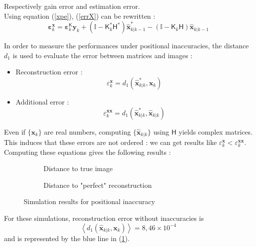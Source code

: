\documentclass[titlepage]{article}
\renewcommand{\H}{\boldsymbol{\mathsf{H}}}
\newcommand{\K}{\boldsymbol{\mathsf{K}}}
\newcommand{\x}{\boldsymbol{x}}
\newcommand{\y}{\boldsymbol{y}}
\newcommand{\xp}{\widehat{\x}_{k|k-1}}
\newcommand{\xe}{\widehat{\x}_{k|k}}
\newcommand{\vbeps}{\boldsymbol{\varepsilon}}
\begin{document}
	Respectively gain error and estimation error.\\
	Using equation (\ref{xpe}), (\ref{errX}) can be rewritten :
	\begin{equation}
		\vbeps^{\x}_k = \vbeps^{\K}_k\y_k + \left(\mathbb{I} - \K_k^*\H^*\right)\xp^* - \left(\mathbb{I} - \K_k\H\right)\xp
	\end{equation}
	
	In order to measure the performances under positional inaccuracies, the distance $d_1$ is used to evaluate the error between matrices and images :
	\begin{itemize}
		\item Reconstruction error : 
		$$
			\varepsilon_k^{\x} = d_1\left(\xe^*,\x_k\right)
		$$
		\item Additional error : 
		$$
			\varepsilon_k^{\x\x} = d_1\left(\xe^*,\xe\right)
		$$
	\end{itemize}

	Even if $\{\x_k\}$ are real numbers, computing $\{\xe\}$ using $\H$ yields complex matrices. This induces that these errors are not ordered : we can get results like $\varepsilon_k^{\x} < \varepsilon_k^{\x\x}$. 
	Computing these equations gives the following results :
	
	
	\begin{figure}[H]
		\centering
		\begin{subfigure}{.5\textwidth}
			\centering
			
			\caption{Distance to true image}
			\label{fig:p_e_x_e}
		\end{subfigure}%
		\begin{subfigure}{.5\textwidth}
			\centering
			
			\caption{Distance to "perfect" reconstruction}
		\end{subfigure}
	\caption{Simulation results for positional inaccuracy}
	\end{figure}
	
	For these simulations, reconstruction error without inaccuracies is 
	$$ %
	\left\langle d_1\left(\xe,\x_k\right)\right\rangle = 8,46\times10^{-4}
	$$
	and is represented by the blue line in (\ref{fig:p_e_x_e}).\\
	
\end{document}

